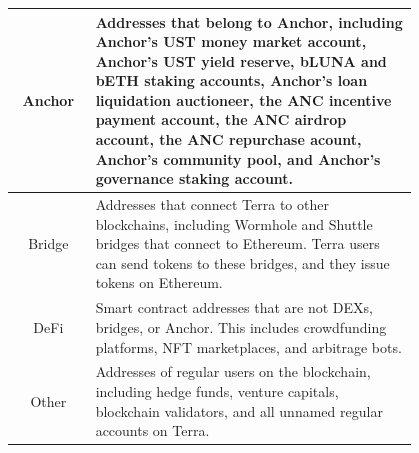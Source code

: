 \begin{tabular}{|c|p{0.8\linewidth}|}
    Anchor & Addresses that belong to Anchor, including Anchor's UST money market account, Anchor's UST yield reserve, bLUNA and bETH staking accounts, Anchor’s loan liquidation auctioneer, the ANC incentive payment account, the ANC airdrop account, the ANC repurchase acount, Anchor's community pool, and Anchor's governance staking account.                                                                                                                                                   \\ \hline
    Bridge & Addresses that connect Terra to other blockchains, including Wormhole and Shuttle bridges that connect to Ethereum. Terra users can send tokens to these bridges, and they issue tokens on Ethereum.                                                                                                                                                                                                                                                                                        \\ \hline
    DeFi   & Smart contract addresses that are not DEXs, bridges, or Anchor. This includes crowdfunding platforms, NFT marketplaces, and arbitrage bots.                                                                                                                                                                                                                                                                                                                                                 \\ \hline
    Other  & Addresses of regular users on the blockchain, including hedge funds, venture capitals, blockchain validators, and all unnamed regular accounts on Terra.                                                                                                                                                                                                                                                                                                                                      \\
    \hline
\end{tabular}